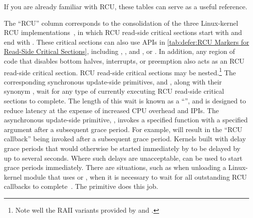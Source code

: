 If you are already familiar with RCU, these tables can
serve as a useful reference.

\QuickQuizEnd

The ``RCU'' column corresponds to the consolidation of the
three Linux-kernel RCU
implementations~\cite{PaulEMcKenney2019RCUCVE,McKenney:2019:CRS:3319647.3325836},
in which RCU read-side critical sections start with
 and end with .
These critical sections can also use  APIs in
\cref{tab:defer:RCU Markers for Read-Side Critical Sections}, including
, ,
and , or .
In addition, any region of code that disables bottom halves, interrupts,
or preemption also acts as an RCU read-side critical section.
RCU read-side critical sections may be nested.\footnote{
	Note well the RAII variants provided by  and
	.}
The corresponding synchronous update-side primitives,
 and , along with
their synonym , wait for any type of currently
executing RCU read-side critical sections to complete.
The length of this wait is known as a ``'', and
 is designed to reduce 
{latency} at the expense of increased CPU overhead and IPIs.
The asynchronous update-side primitive, ,
invokes a specified function with a specified argument after a
subsequent grace period.
For example,  will result in
the ``RCU callback'' 
being invoked after a subsequent grace period.
Kernels built with  delay grace periods that would
otherwise be started immediately by  to be delayed by up
to several seconds.
Where such delays are unacceptable,  can be used
to start grace periods immediately.
There are situations,
such as when unloading a Linux-kernel module that uses 
or , when it is necessary to wait for all
outstanding RCU callbacks to complete~\cite{PaulEMcKenney2007rcubarrier}.
The  primitive does this job.

